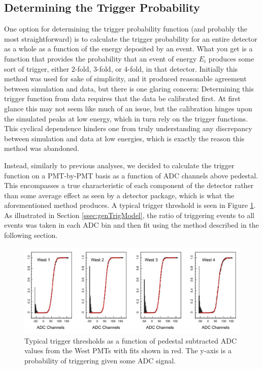 \subsection{Determining the Trigger Probability}
One option for determining the trigger probability function (and probably the 
most straightforward) is to calculate the trigger probability for an entire detector as 
a whole as a function of the energy deposited by an event. What you get is a 
function that provides the probability that an event of energy $ E_i $ 
produces some sort of trigger, either 2-fold, 3-fold, or 4-fold, in that 
detector. Initially this method was used for sake of simplicity, and it produced 
reasonable agreement between simulation and data, but there is one 
glaring concern: Determining this trigger function from data requires that the data be 
calibrated first. At first glance this may not seem like much of an issue, but the 
calibration hinges upon the 
simulated peaks at low energy, which in turn rely on the trigger functions. This 
cyclical dependence hinders one from truly understanding any discrepancy between 
simulation and data at low energies, which is exactly the reason this method was 
abandoned.  

Instead, similarly to previous analyses, we decided to calculate the trigger
function on a PMT-by-PMT basis as a function of ADC channels above pedestal. This
encompasses a true characteristic of each component of the detector rather than some
average effect as seen by a detector package, which is what the aforementioned 
method produces. A typical trigger threshold is seen in Figure \ref{fig:trigger_thresh}.
As illustrated in Section \ref{ssec:genTrigModel}, the ratio of triggering events
to all events was taken in each ADC bin and then fit using the method described
in the following section.
  

\begin{figure}[h] 
\centering
\includegraphics[scale=.6]{3-UCNAAnalysis/triggerThresholds.pdf}
\caption{Typical trigger thresholds as a function of pedestal subtracted
  ADC values from the West PMTs with fits shown in red. The y-axis
  is a probability of triggering given some ADC signal.}
\label{fig:trigger_thresh}
\end{figure}

